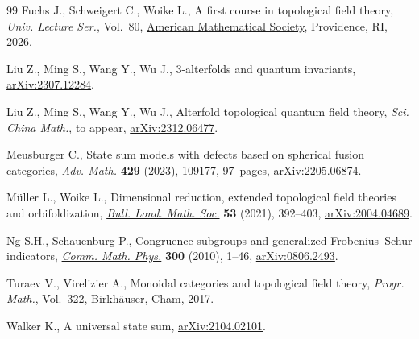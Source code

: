 \documentclass[10pt,a4paper]{amsart}
\numberwithin{equation}{section}
\theoremstyle{definition}
\begin{document}
\begin{thebibliography}{99}
Fuchs J., Schweigert C., Woike L., A first course in topological field theory,
 \textit{Univ. Lecture Ser.}, Vol.~80,
 \href{https://doi.org/10.1090/ulect/080}{American Mathematical Society},
 Providence, RI, 2026.

Liu Z., Ming S., Wang Y., Wu J., 3-alterfolds and quantum invariants,
 \href{http://arxiv.org/abs/2307.12284}{arXiv:2307.12284}.

Liu Z., Ming S., Wang Y., Wu J., Alterfold topological quantum field theory,
 \textit{Sci. China Math.}, {t}o appear,
 \href{http://arxiv.org/abs/2312.06477}{arXiv:2312.06477}.

Meusburger C., State sum models with defects based on spherical fusion
 categories, \href{https://doi.org/10.1016/j.aim.2023.109177}{\textit{Adv.
 Math.}} \textbf{429} (2023), 109177, 97~pages,
 \href{http://arxiv.org/abs/2205.06874}{arXiv:2205.06874}.

M\"uller L., Woike L., Dimensional reduction, extended topological field
 theories and orbifoldization,
 \href{https://doi.org/10.1112/blms.12427}{\textit{Bull. Lond. Math. Soc.}}
 \textbf{53} (2021), 392--403,
 \href{http://arxiv.org/abs/2004.04689}{arXiv:2004.04689}.

Ng S.H., Schauenburg P., Congruence subgroups and generalized
 {F}robenius--{S}chur indicators,
 \href{https://doi.org/10.1007/s00220-010-1096-6}{\textit{Comm. Math. Phys.}}
 \textbf{300} (2010), 1--46,
 \href{http://arxiv.org/abs/0806.2493}{arXiv:0806.2493}.

Turaev V., Virelizier A., Monoidal categories and topological field theory,
 \textit{Progr. Math.}, Vol.~322,
 \href{https://doi.org/10.1007/978-3-319-49834-8}{Birkh\"auser}, Cham, 2017.

Walker K., A universal state sum,
 \href{http://arxiv.org/abs/2104.02101}{arXiv:2104.02101}.

\end{thebibliography}
\end{document}
